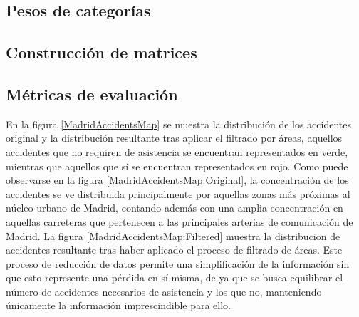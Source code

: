 \documentclass{uathesis-es}
\begin{document}
\subsection{Pesos de categorías}

\subsection{Construcción de matrices}

\subsection{Métricas de evaluación}



En la figura \ref{MadridAccidentsMap} se muestra la distribución de los accidentes original y la distribución resultante tras aplicar el filtrado por áreas, aquellos accidentes que no requiren de asistencia se encuentran representados en verde, mientras que aquellos que sí se encuentran representados en rojo. Como puede observarse en la figura \ref{MadridAccidentsMap:Original}, la concentración de los accidentes se ve distribuida principalmente por aquellas zonas más próximas al núcleo urbano de Madrid, contando además con una amplia concentración en aquellas carreteras que pertenecen a las principales arterias de comunicación de Madrid. La figura  \ref{MadridAccidentsMap:Filtered} muestra la distribucion de accidentes resultante tras haber aplicado el proceso de filtrado de áreas. Este proceso de reducción de datos permite una simplificación de la información sin que esto represente una pérdida en sí misma, de ya que se busca equilibrar el número de accidentes necesarios de asistencia y los que no, manteniendo únicamente la información imprescindible para ello.
\end{document}
